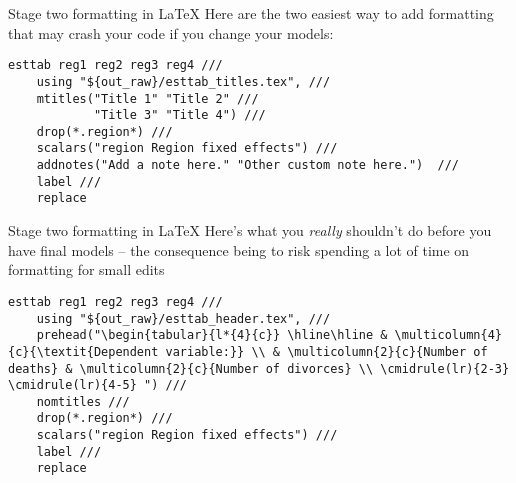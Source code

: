 \documentclass[aspectratio=169]{beamer}
\begin{document}
\begin{frame}[fragile]{Stage two formatting in \LaTeX }
Here are the two easiest way to add formatting that may crash your code if you change your models:

\begin{multicols}{2}
\begin{lstlisting}
esttab reg1 reg2 reg3 reg4 ///
    using "${out_raw}/esttab_titles.tex", ///
    mtitles("Title 1" "Title 2" ///
            "Title 3" "Title 4") ///
    drop(*.region*) ///
    scalars("region Region fixed effects") ///
    addnotes("Add a note here." "Other custom note here.")  ///
    label ///
    replace
\end{lstlisting}

\begin{table}
\begin{adjustbox}{max width = .45\textwidth}

\end{adjustbox}
\end{table}
\end{multicols}
\end{frame}

\begin{frame}[fragile]{Stage two formatting in \LaTeX }
Here's what you \textit{really} shouldn't do before you have final models -- the consequence being to risk spending a lot of time on formatting for small edits

\begin{multicols}{2}
\begin{lstlisting}
esttab reg1 reg2 reg3 reg4 ///
    using "${out_raw}/esttab_header.tex", ///
    prehead("\begin{tabular}{l*{4}{c}} \hline\hline & \multicolumn{4}{c}{\textit{Dependent variable:}} \\ & \multicolumn{2}{c}{Number of deaths} & \multicolumn{2}{c}{Number of divorces} \\ \cmidrule(lr){2-3} \cmidrule(lr){4-5} ") ///
    nomtitles ///
    drop(*.region*) ///
    scalars("region Region fixed effects") ///
    label ///
    replace
\end{lstlisting}

\begin{table}
\begin{adjustbox}{max width = .45\textwidth}

\end{adjustbox}
\end{table}
\end{multicols}
\end{frame}
\end{document}
